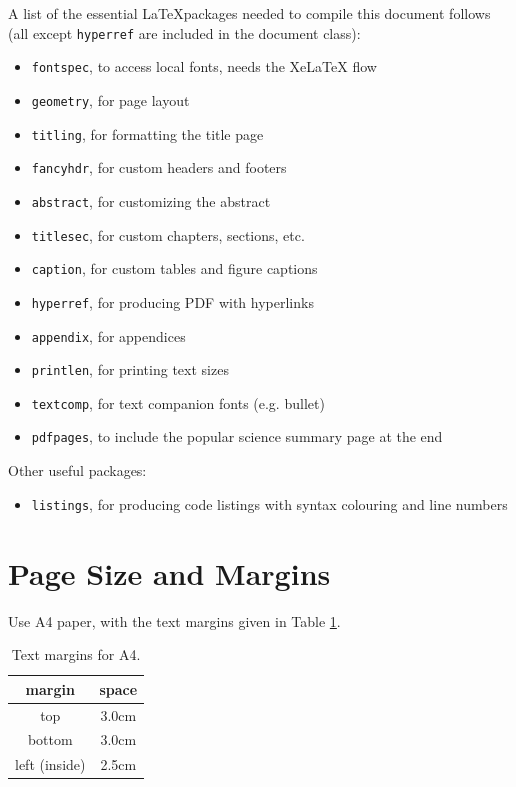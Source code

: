 \documentclass[nofilelist]{cslthse-msc}
\begin{document}
\begin{appendices}
\noindent A list of the essential \LaTeX packages needed to compile this document follows (all except \texttt{hyperref} are included in the document class):
\begin{itemize}
\item \texttt{fontspec}, to access local fonts, needs the XeLaTeX flow
\item \texttt{geometry}, for page layout
\item \texttt{titling}, for formatting the title page
\item \texttt{fancyhdr}, for custom headers and footers
\item \texttt{abstract}, for customizing the abstract
\item \texttt{titlesec}, for custom chapters, sections, etc.
\item \texttt{caption}, for custom tables and figure captions
\item \texttt{hyperref}, for producing PDF with hyperlinks
\item \texttt{appendix}, for appendices
\item \texttt{printlen}, for printing text sizes
\item \texttt{textcomp}, for text companion fonts (e.g. bullet)
\item \texttt{pdfpages}, to include the popular science summary page at the end
\end{itemize}

\noindent Other useful packages:
\begin{itemize}
\item \texttt{listings}, for producing code listings with syntax colouring and line numbers
\end{itemize}

\section{Page Size and Margins}
Use A4 paper, with the text margins given in Table \ref{tab:margins}.
\begin{table}[!hbt]
\centering
\caption{Text margins for A4.}\label{tab:margins}
\begin{tabular}{cc}
\hline
\textbf{margin} & \textbf{space} \\
\hline 
top &  3.0cm\\ 

bottom & 3.0cm \\ 
 
left (inside) & 2.5cm \\ 


\end{tabular}
\end{table}
\end{appendices}
\end{document}
